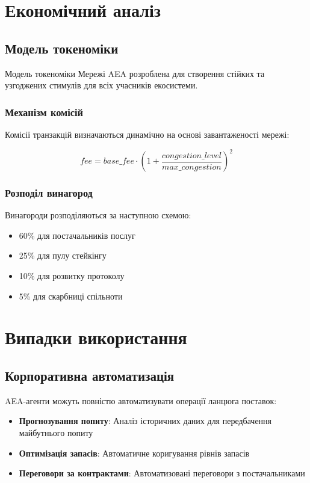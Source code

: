 \documentclass[12pt,a4paper]{article}
\begin{document}
\section{Економічний аналіз}

\subsection{Модель токеноміки}

Модель токеноміки Мережі AEA розроблена для створення стійких та узгоджених стимулів для всіх учасників екосистеми.

\subsubsection{Механізм комісій}

Комісії транзакцій визначаються динамічно на основі завантаженості мережі:

\begin{equation}
fee = base\_fee \cdot (1 + \frac{congestion\_level}{max\_congestion})^2
\end{equation}

\subsubsection{Розподіл винагород}

Винагороди розподіляються за наступною схемою:
\begin{itemize}
\item 60\% для постачальників послуг
\item 25\% для пулу стейкінгу
\item 10\% для розвитку протоколу
\item 5\% для скарбниці спільноти
\end{itemize}

\section{Випадки використання}

\subsection{Корпоративна автоматизація}

AEA-агенти можуть повністю автоматизувати операції ланцюга поставок:

\begin{itemize}
\item \textbf{Прогнозування попиту}: Аналіз історичних даних для передбачення майбутнього попиту
\item \textbf{Оптимізація запасів}: Автоматичне коригування рівнів запасів
\item \textbf{Переговори за контрактами}: Автоматизовані переговори з постачальниками
\end{itemize}
\end{document}
